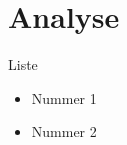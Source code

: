 \chapter{Analyse}\label{chap:Analyse}


Liste
\begin{itemize}
\item Nummer 1
\item Nummer 2
\end{itemize}
